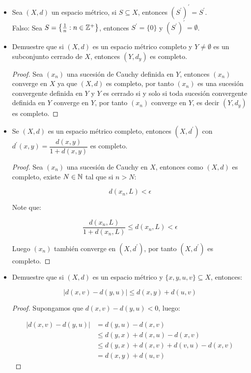 \begin{itemize}[leftmargin=*]
\begin{proof}
\end{proof}

\item Sea $(X,d)$ un espacio métrico, si $S\subseteq X$, entonces $(S^{\prime})^{\prime}=S^{\prime}$.\\

Falso: Sea $S=\left\{\frac{1}{n}: n\in \mathbb{Z}^+\right\}$, entonces $S^{\prime}=\{0\}$ y $(S^{\prime})^{\prime}=\emptyset$.\\

\item Demuestre que si $(X,d)$ es un espacio métrico completo y $Y\neq \emptyset$ es un subconjunto cerrado de $X$, entonces $(Y,d_y)$ es completo.\\

\begin{proof}
Sea $(x_n)$ una sucesión de Cauchy definida en $Y$, entonces $(x_n)$ converge en $X$ ya que $(X,d)$ es completo, por tanto $(x_n)$ es una sucesión convergente definida en $Y$ y $Y$ es cerrado si y solo si toda sucesión convergente definida en $Y$ converge en $Y$, por tanto $(x_n)$ converge en $Y$, es decir $(Y,d_y)$ es completo.
\end{proof}

\item Se $(X,d)$ es un espacio métrico completo, entonces $(X,d^{\prime})$ con $d^{\prime}(x,y)=\dfrac{d(x,y)}{1+d(x,y)}$ es completo.\\

\begin{proof}
Sea $(x_n)$ una sucesión de Cauchy en $X$, entonces como $(X,d)$ es completo, existe $N\in \mathbb{N}$ tal que si $n>N$:

$$d(x_n,L)<\epsilon$$

Note que:

$$\dfrac{d(x_n,L)}{1+d(x_n,L)}\leq d(x_n,L)<\epsilon$$

Luego $(x_n)$ también converge en $(X,d^{\prime})$, por tanto $(X,d^{\prime})$ es completo.
\end{proof}

\item Demuestre que si $(X,d)$ es un espacio métrico y $\{x,y,u,v\}\subseteq X$, entonces:

$$|d(x,v)-d(y,u)|\leq d(x,y)+d(u,v)$$

\begin{proof}
Supongamos que $d(x,v)-d(y,u)<0$, luego:

\begin{align*}
 |d(x,v)-d(y,u)|&=d(y,u)-d(x,v)\\
 &\leq d(y,x)+d(x,u)-d(x,v)\\
 &\leq d(y,x)+d(x,v)+d(v,u)-d(x,v)\\
 &=d(x,y)+d(u,v)  
\end{align*}


\end{proof}
\end{itemize}
